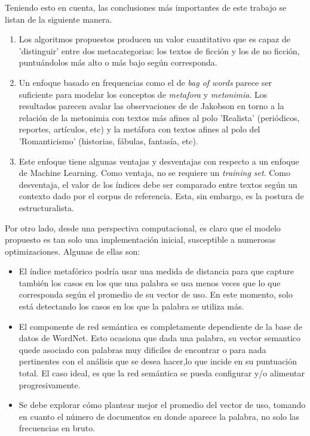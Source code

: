 \documentclass[12pt,letterpaper,twoside]{article}
\begin{document}
Teniendo esto en cuenta, las conclusiones más importantes de este
trabajo se listan de la siguiente manera.


\begin{enumerate}
\item Los algoritmos propuestos producen un valor cuantitativo que es
capaz de 'distinguir' entre dos metacategorias: los textos de
ficción y los de no ficción, puntuándolos más alto o más bajo
según corresponda.

\item Un enfoque basado en frequencias como el de \emph{bag of words} parece
ser suficiente para modelar los conceptos de \emph{metafora} y
\emph{metonimia}.  Los resultados parecen avalar las observaciones de de
Jakobson en torno a la relación de la metonimia con textos más
afines al polo 'Realista' (periódicos, reportes, artículos, etc) y
la metáfora con textos afines al polo del 'Romanticismo'
(historias, fábulas, fantasía, etc).

\item Este enfoque tiene algunas ventajas y desventajas con respecto
a un enfoque de Machine Learning. Como ventaja, no se requiere
un \emph{training set}. Como desventaja, el valor de los índices
debe ser comparado entre textos según un contexto dado por
el corpus de referencia. Esta, sin embargo, es la postura
de estructuralista.
\end{enumerate}


Por otro lado, desde una perspectiva computacional, es claro que el
modelo propuesto es tan solo una implementación inicial, susceptible a
numerosas optimizaciones. Algunas de ellas son:

\begin{itemize}
\item El índice metafórico podría usar una medida de distancia para que
capture también los casos en los que una palabra se usa menos veces
que lo que corresponda según el promedio de su vector de uso. En
este momento, solo está detectando los casos en los que la palabra
se utiliza más.

\item El componente de red semántica es completamente dependiente de la
base de datos de WordNet. Esto ocasiona que dada una palabra, su
vector semantico quede asociado con palabras muy dificiles de
encontrar o para nada pertinentes con el análisis que se desea
hacer,lo que incide en su puntuación total. El caso ideal, es que la
red semántica se pueda configurar y/o alimentar progresivamente.

\item Se debe explorar cómo plantear mejor el promedio del vector de uso,
tomando en cuanto el número de documentos en donde aparece la
palabra, no solo las frecuencias en bruto.
\end{itemize}
\end{document}

